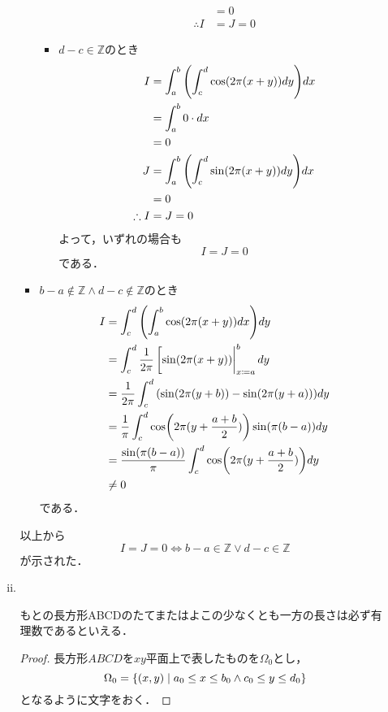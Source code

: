 \begin{enumerate}[(1)]
\begin{enumerate}[(i)]
\begin{itemize}
\begin{itemize}
\begin{align}
                    &=0\\
                    \therefore
                    I&=J=0
                \end{align}
                \item $d - c \in \mathbb{Z}$のとき
                \begin{align}
                    I
                    &=\int^b_a \qty(\int^d_c \cos(2\pi(x+y))dy) dx\\
                    &=\int^b_a 0\cdot dx\\
                    &=0\\
                    J
                    &=\int^b_a \qty(\int^d_c \sin(2\pi(x+y))dy) dx\\
                    &=0\\
                    \therefore
                    I&=J=0
                \end{align}
                よって，いずれの場合も
                \begin{equation}
                    I=J=0
                \end{equation}
                である．
            \end{itemize}
            \item $b - a \notin \mathbb{Z} \land d - c \notin \mathbb{Z}$のとき
            \begin{align}
                I
                &=\int^d_c \qty(\int^b_a \cos(2\pi(x+y))dx) dy\\
                &=\int^d_c \frac{1}{2\pi} \eval[\sin(2\pi(x+y)) |^b_{x\coloneqq a} dy\\
                &=\frac{1}{2\pi} \int^d_c \qty(\sin(2\pi(y+b))- \sin(2\pi(y+a))) dy\\
                &=\frac{1}{\pi} \int^d_c \cos(2\pi(y+\frac{a+b}{2}))\sin(\pi(b-a)) dy\\
                &=\frac{\sin(\pi(b-a))}{\pi} \int^d_c \cos(2\pi(y+\frac{a+b}{2})) dy\\
                &\ne 0
            \end{align}
            である．
        \end{itemize}
        以上から
        \begin{equation}
            I=J=0 \Longleftrightarrow  b - a \in \mathbb{Z} \lor d - c \in \mathbb{Z}
        \end{equation}
        が示された．
        \item \
        \begin{theorem}
            もとの長方形ABCDのたてまたはよこの少なくとも一方の長さは必ず有理数であるといえる．
        \end{theorem}
        \begin{proof}
            長方形$ABCD$を$xy$平面上で表したものを$\Omega_0$とし，
            \begin{equation}
                \Omega_0=\qty{(x,y)\mathrel{}\middle|\mathrel{}a_0\le x \le b_0\land c_0 \le y \le d_0}
            \end{equation}
            となるように文字をおく．
            

\end{proof}
\end{enumerate}
\end{enumerate}
